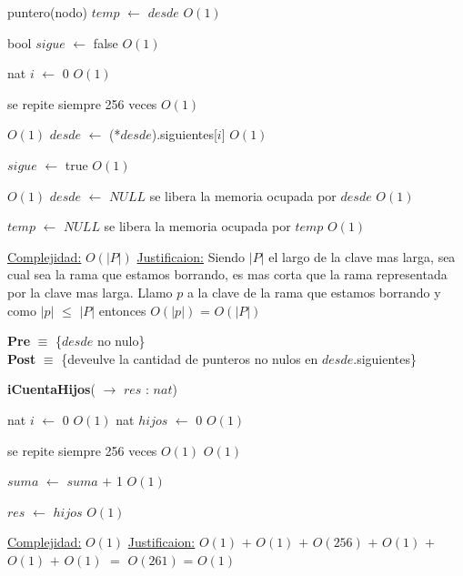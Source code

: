 \begin{Algoritmos}
\begin{algorithm}[H]
\begin{algorithmic}[1]
	\State puntero(nodo) $temp$ $\gets$ $desde$ \Comment $O(1)$

	\State bool $sigue$ $\gets$ false \Comment $O(1)$

	\State nat $i$ $\gets$ 0 \State $O(1)$

	 \Comment se repite siempre 256 veces $O(1)$

		 \Comment $O(1)$
			\State $desde$ $\gets$ (*$desde$).siguientes[$i$] \Comment $O(1)$		
		
			\State $sigue$ $\gets$ true \Comment $O(1)$		
		
		\EndIf
	\EndWhile

\EndWhile

 \Comment $O(1)$
	\State $desde$ $\gets$ $NULL$ \Comment se libera la memoria ocupada por $desde$ $O(1)$

\EndIf

\State $temp$ $\gets$ $NULL$ \Comment se libera la memoria ocupada por $temp$ $O(1)$


\medskip
\State \underline{Complejidad:} $O(|P|)$
\State \underline{Justificaion:} Siendo $|P|$ el largo de la clave mas larga, sea cual sea la rama que estamos borrando, es mas corta que la rama representada por la clave mas larga. Llamo $p$ a la clave de la rama que estamos borrando y como $|p|$ $\leq$ $|P|$ entonces $O(|p|)$ = $O(|P|)$ 

\end{algorithmic}
\end{algorithm}
  
 

\textbf{Pre} $\equiv$ \{$desde$ no nulo\}\\%
\textbf{Post} $\equiv$ \{deveulve la cantidad de punteros no nulos en $desde$.siguientes\}%

\begin{algorithm}[H]
{\textbf{iCuentaHijos}(} $\to$ $res$ : $nat$)
\begin{algorithmic}[1]

\State nat $i$ $\gets$ 0 \Comment $O(1)$
\State nat $hijos$ $\gets$ 0 \Comment $O(1)$

 \Comment se repite siempre 256 veces $O(1)$
	 \State $O(1)$ 
	
	\State $suma$ $\gets$ $suma$ $+$ 1 \Comment $O(1)$
	
	\EndIf
\EndWhile
\State $res$ $\gets$ $hijos$ \Comment $O(1)$


\medskip
\State \underline{Complejidad:} $O(1)$
\State \underline{Justificaion:}  $O(1)$ $+$ $O(1)$ $+$ $O(256)$ $+$ $O(1)$ $+$ $O(1)$ $+$ $O(1)$ $=$ $O(261)$ = $O(1)$

\end{algorithmic}
\end{algorithm}
  
  
  
\end{Algoritmos}

